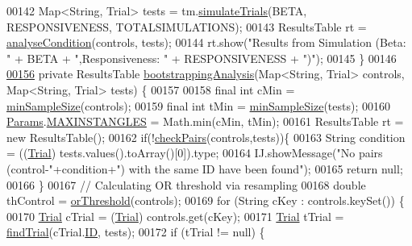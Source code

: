 \begin{DoxyCode}
{00142     Map<String, Trial> tests = tm.\hyperlink{classfunctions_1_1_trial_manager_a83f9d10eaa1ef4efb6de1f0e8b690978}{simulateTrials}(BETA, RESPONSIVENESS, TOTALSIMULATIONS);
00143     ResultsTable rt = \hyperlink{classanalysis_1_1_chemotaxis_aaa89eb018d311df9e98b904088d282a5}{analyseCondition}(controls, tests);
00144     rt.show(\textcolor{stringliteral}{"Results from Simulation (Beta: "} + BETA + \textcolor{stringliteral}{",Responsiveness: "} + RESPONSIVENESS + \textcolor{stringliteral}{")"});
00145   \}
00146 
\hypertarget{_chemotaxis_8java_source_l00156}{}\hyperlink{classanalysis_1_1_chemotaxis_a381aa5dd2dd75a72b6b21f7b2475d888}{00156}   \textcolor{keyword}{private} ResultsTable \hyperlink{classanalysis_1_1_chemotaxis_a381aa5dd2dd75a72b6b21f7b2475d888}{bootstrappingAnalysis}(Map<String, Trial> controls, Map<String,
       Trial> tests) \{
00157 
00158     \textcolor{keyword}{final} \textcolor{keywordtype}{int} cMin = \hyperlink{classanalysis_1_1_chemotaxis_a3ae63569c841ffc6aa09be276f526c03}{minSampleSize}(controls);
00159     \textcolor{keyword}{final} \textcolor{keywordtype}{int} tMin = \hyperlink{classanalysis_1_1_chemotaxis_a3ae63569c841ffc6aa09be276f526c03}{minSampleSize}(tests);
00160     \hyperlink{classdata_1_1_params}{Params}.\hyperlink{classdata_1_1_params_a11078ae453283411c72774c45caa7519}{MAXINSTANGLES} = Math.min(cMin, tMin);
00161     ResultsTable rt = \textcolor{keyword}{new} ResultsTable();
00162     \textcolor{keywordflow}{if}(!\hyperlink{classanalysis_1_1_chemotaxis_a1ebc6d4aaad3ec1c0eca87acb729ffb5}{checkPairs}(controls,tests))\{
00163        String condition = ((\hyperlink{classdata_1_1_trial}{Trial}) tests.values().toArray()[0]).type;
00164        IJ.showMessage(\textcolor{stringliteral}{"No pairs (control-"}+condition+\textcolor{stringliteral}{") with the same ID have been found"});
00165        \textcolor{keywordflow}{return} null;
00166     \}
00167     \textcolor{comment}{// Calculating OR threshold via resampling}
00168     \textcolor{keywordtype}{double} thControl = \hyperlink{classanalysis_1_1_chemotaxis_a8ee54f019a9258760e20482e3cd6b851}{orThreshold}(controls);
00169     \textcolor{keywordflow}{for} (String cKey : controls.keySet()) \{
00170       \hyperlink{classdata_1_1_trial}{Trial} cTrial = (\hyperlink{classdata_1_1_trial}{Trial}) controls.get(cKey);
00171       \hyperlink{classdata_1_1_trial}{Trial} tTrial = \hyperlink{classanalysis_1_1_chemotaxis_a40fa55bdb0e1b4e7e0f9de92076ab2f9}{findTrial}(cTrial.\hyperlink{classdata_1_1_trial_a317298c3409575f71e43acd3f73ce295}{ID}, tests);
00172       \textcolor{keywordflow}{if} (tTrial != null) \{
}
\end{DoxyCode}
